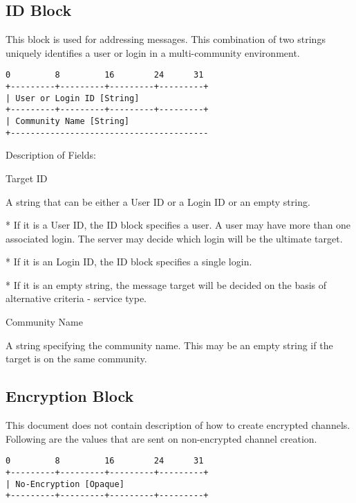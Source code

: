 \documentclass[titlepage,oneside]{book}
\begin{document}
\subsection{ID Block}

\par{} This block is used for addressing messages. This combination of
two strings uniquely identifies a user or login in a multi-community
environment.

\begin{verbatim}
0         8         16        24      31
+---------+---------+---------+---------+
| User or Login ID [String]
+---------+---------+---------+---------+
| Community Name [String]
+----------------------------------------
\end{verbatim}

\par{} Description of Fields:

\par{} Target ID
\par{}   A string that can be either a User ID or a Login ID or an empty
  string.
\par{}     * If it is a User ID, the ID block specifies a user. A user may
      have more than one associated login. The server may decide which
      login will be the ultimate target.
\par{}     * If it is an Login ID, the ID block specifies a single login.
\par{}     * If it is an empty string, the message target will be decided on
      the basis of alternative criteria - service type.

\par{} Community Name
\par{}   A string specifying the community name. This may be an empty string
  if the target is on the same community.

\subsection{Encryption Block}

\par{} This document does not contain description of how to create
encrypted channels. Following are the values that are sent on
non-encrypted channel creation.

\begin{verbatim}
0         8         16        24      31
+---------+---------+---------+---------+
| No-Encryption [Opaque]
+---------+---------+---------+---------+
\end{verbatim}
\end{document}
